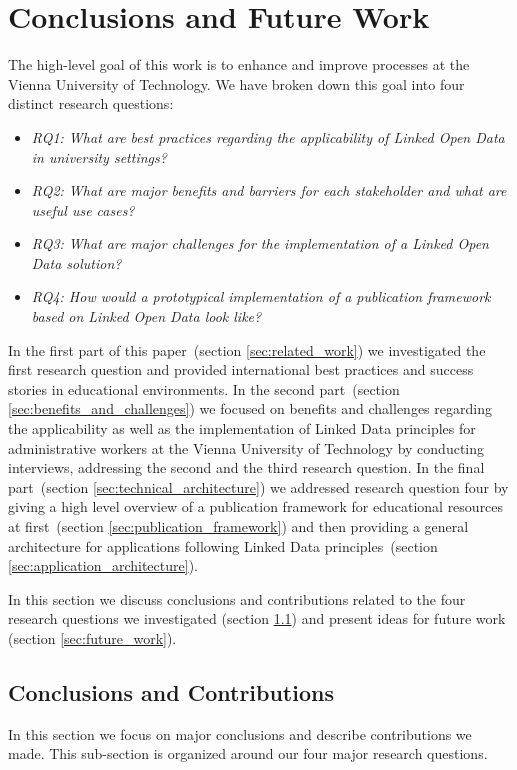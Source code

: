 \documentclass{article}
\begin{document}
\section{Conclusions and Future Work}
The high-level goal of this work is to enhance and improve processes at the Vienna University of Technology. We have broken down this goal
into four distinct research questions:
\begin{itemize}
	\item \textit{RQ1: What are best practices regarding the applicability of Linked Open Data in university settings?}
	\item \textit{RQ2: What are major benefits and barriers for each stakeholder and what are useful use cases?}
	\item \textit{RQ3: What are major challenges for the implementation of a Linked Open Data solution?}
	\item \textit{RQ4: How would a prototypical implementation of a publication framework based on Linked Open Data look like?}
\end{itemize}
In the first part of this paper~(section \ref{sec:related_work}) we investigated the first research question and provided international best practices and success stories 
in educational environments. In the second part~(section \ref{sec:benefits_and_challenges}) we focused on benefits and challenges regarding the applicability as well as
the implementation of Linked Data principles for administrative workers at the Vienna University of Technology by conducting interviews, addressing the second and the third research question. In the final part~(section \ref{sec:technical_architecture}) we addressed research question four by giving a high level overview of a publication framework for educational resources at first~(section \ref{sec:publication_framework}) and then providing a general architecture for applications following Linked Data principles~(section \ref{sec:application_architecture}). 

In this section we discuss conclusions and contributions related to the four research questions we investigated (section \ref{sec:conclusions}) and present ideas for future work (section \ref{sec:future_work}). 
\subsection{Conclusions and Contributions}
\label{sec:conclusions}
In this section we focus on major conclusions and describe contributions we made. This sub-section is organized around our four major research questions.
\end{document}
